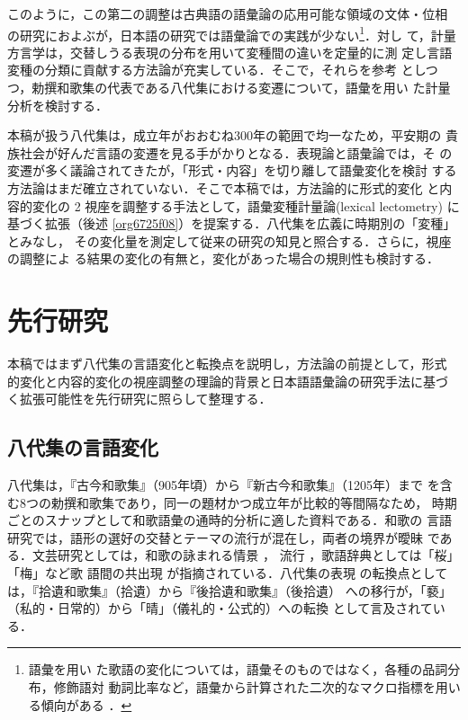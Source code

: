 \documentclass[submit]{ipsj}
\renewcommand{\ref}{\cref}
\begin{document}
このように，この第二の調整は古典語の語彙論の応用可能な領域の文体・位相
の研究におよぶが，日本語の研究では語彙論での実践が少ない\footnote{語彙を用い
た歌語の変化については，語彙そのものではなく，各種の品詞分布，修飾語対
動詞比率など，語彙から計算された二次的なマクロ指標を用いる傾向がある
\cite{tsuji1998Uta,nishihata1992Waka,hatano1941Waka}．}．対し
て，計量方言学は，交替しうる表現の分布を用いて変種間の違いを定量的に測
定し言語変種の分類に貢献する方法論が充実している．そこで，それらを参考
としつつ，勅撰和歌集の代表である八代集における変遷について，語彙を用い
た計量分析を検討する．

本稿が扱う八代集は，成立年がおおむね300年の範囲で均一なため，平安期の
貴族社会が好んだ言語の変遷を見る手がかりとなる．表現論と語彙論では，そ
の変遷が多く議論されてきたが，「形式・内容」を切り離して語彙変化を検討
する方法論はまだ確立されていない．そこで本稿では，方法論的に形式的変化
と内容的変化の 2 視座を調整する手法として，語彙変種計量論(lexical
lectometry) \cite{Speelman2003Profilebased} に基づく拡張（後述
\ref{org6725f08}）を提案する．八代集を広義に時期別の「変種」とみなし，
その変化量を測定して従来の研究の知見と照合する．さらに，視座の調整によ
る結果の変化の有無と，変化があった場合の規則性も検討する．
\section{先行研究\label{org639cc74}}
\label{sec:org1117456}
本稿ではまず八代集の言語変化と転換点を説明し，方法論の前提として，形式
的変化と内容的変化の視座調整の理論的背景と日本語語彙論の研究手法に基づ
く拡張可能性を先行研究に照らして整理する．
\subsection{八代集の言語変化\label{org8cf52cf}}
\label{sec:org448a3ed}
八代集は，『古今和歌集』（905年頃）から『新古今和歌集』（1205年）まで
を含む8つの勅撰和歌集であり，同一の題材かつ成立年が比較的等間隔なため，
時期ごとのスナップとして和歌語彙の通時的分析に適した資料である．和歌の
言語研究では，語形の選好の交替とテーマの流行が混在し，両者の境界が曖昧
である．文芸研究としては，和歌の詠まれる情景 \cite{ueno1976Koshui}，
流行 \cite{kawamura1991Sekkan}，歌語辞典としては「桜」「梅」など歌
語間の共出現 \cite{katagiri1983Uta} が指摘されている．八代集の表現
の転換点としては，『拾遺和歌集』（拾遺）から『後拾遺和歌集』（後拾遺）
への移行が，「褻」（私的・日常的）から「晴」（儀礼的・公式的）への転換
として言及されている\cite{ueno1976Koshui,kawamura1991Sekkan}．
\end{document}
